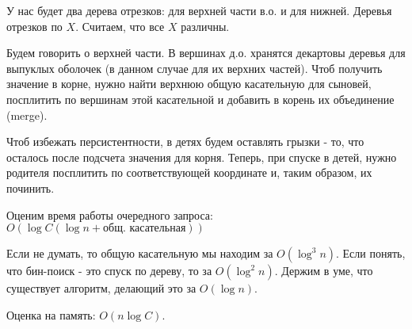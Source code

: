 У нас будет два дерева отрезков: для верхней части в.о. и для нижней. Деревья отрезков по $X$. Считаем, что все $X$ различны.

Будем говорить о верхней части. В вершинах д.о. хранятся декартовы деревья для выпуклых оболочек (в данном случае для их верхних частей). 
Чтоб получить значение в корне, нужно найти верхнюю общую касательную для сыновей, посплитить по вершинам этой касательной и добавить 
в корень их объединение (merge). 

Чтоб избежать персистентности, в детях будем оставлять грызки - то, что осталось после подсчета значения для корня. Теперь, при спуске в детей,
нужно родителя посплитить по соответствующей координате и, таким образом, их починить.

Оценим время работы очередного запроса:
$O\left(\log{C}\left(\log{n} + \text{общ. касательная} \right)\right)$

Если не думать, то общую касательную мы находим за $O(\log^3{n})$. Если понять, что бин-поиск - это спуск по дереву, то за $O(\log^2{n})$. 
Держим в уме, что существует алгоритм, делающий это за $O(\log{n})$.

Оценка на память: $O(n\log{C})$.
